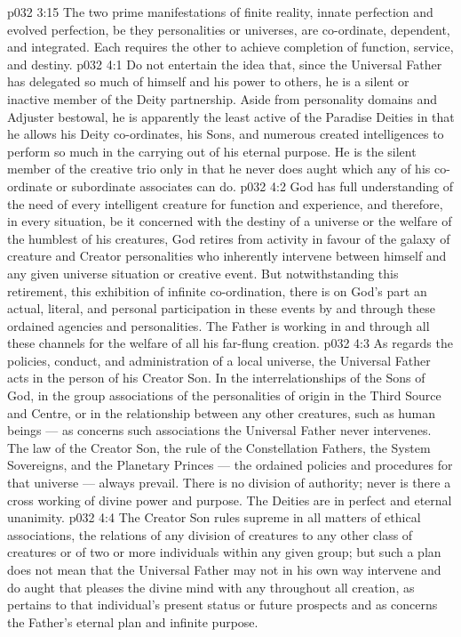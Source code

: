 \vs p032 3:15 The two prime manifestations of finite reality, innate perfection and evolved perfection, be they personalities or universes, are co\hyp{}ordinate, dependent, and integrated. Each requires the other to achieve completion of function, service, and destiny.
\vs p032 4:1 Do not entertain the idea that, since the Universal Father has delegated so much of himself and his power to others, he is a silent or inactive member of the Deity partnership. Aside from personality domains and Adjuster bestowal, he is apparently the least active of the Paradise Deities in that he allows his Deity co\hyp{}ordinates, his Sons, and numerous created intelligences to perform so much in the carrying out of his eternal purpose. He is the silent member of the creative trio only in that he never does aught which any of his co\hyp{}ordinate or subordinate associates can do.
\vs p032 4:2 God has full understanding of the need of every intelligent creature for function and experience, and therefore, in every situation, be it concerned with the destiny of a universe or the welfare of the humblest of his creatures, God retires from activity in favour of the galaxy of creature and Creator personalities who inherently intervene between himself and any given universe situation or creative event. But notwithstanding this retirement, this exhibition of infinite co\hyp{}ordination, there is on God’s part an actual, literal, and personal participation in these events by and through these ordained agencies and personalities. The Father is working in and through all these channels for the welfare of all his far\hyp{}flung creation.
\vs p032 4:3 \pc As regards the policies, conduct, and administration of a local universe, the Universal Father acts in the person of his Creator Son. In the interrelationships of the Sons of God, in the group associations of the personalities of origin in the Third Source and Centre, or in the relationship between any other creatures, such as human beings --- as concerns such associations the Universal Father never intervenes. The law of the Creator Son, the rule of the Constellation Fathers, the System Sovereigns, and the Planetary Princes --- the ordained policies and procedures for that universe --- always prevail. There is no division of authority; never is there a cross working of divine power and purpose. The Deities are in perfect and eternal unanimity.
\vs p032 4:4 The Creator Son rules supreme in all matters of ethical associations, the relations of any division of creatures to any other class of creatures or of two or more individuals within any given group; but such a plan does not mean that the Universal Father may not in his own way intervene and do aught that pleases the divine mind with any  throughout all creation, as pertains to that individual’s present status or future prospects and as concerns the Father’s eternal plan and infinite purpose.
